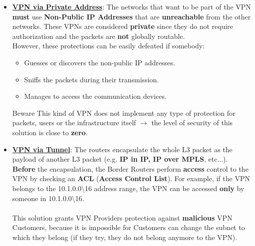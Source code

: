 \begin{itemize}
    \item \underline{\textbf{VPN via Private Address}}: The networks that want to be part of the VPN \textbf{must} use \textbf{Non-Public IP Addresses} that are \textbf{unreachable} from the other networks. These VPNs are considered \textbf{private} since they do not require authorization and the packets are \textbf{not} globally routable.\\   
    However, these protections can be easily defeated if somebody:
    \begin{itemize}
        \item Guesses or discovers the non-public IP addresses.
        \item Sniffs the packets during their transmission.
        \item Manages to access the communication devices.
    \end{itemize}
    \vspace{-0.2cm}
    \begin{quotebox-red}{Beware}
        This kind of VPN does not
        implement any type of protection for packets, users or the infrastructure itself \(\rightarrow \) the level of security of this solution is close to \textbf{zero}.
    \end{quotebox-red}
    \item \underline{\textbf{VPN via Tunnel}}: The routers encapsulate the whole L3 packet as the payload of another L3 packet (e.g. \textbf{IP in
    IP, IP over MPLS}, etc...). \textbf{Before} the encapsulation, the Border Routers perform \textbf{access} control to the VPN by checking an \textbf{ACL} (\textbf{Access Control List}).  
    For example, if the VPN belongs to the 10.1.0.0\textbackslash16 address range, the VPN can be accessed \textbf{only} by someone in 10.1.0.0\textbackslash16.\\    
    \\
    This solution grants VPN Providers protection against \textbf{malicious} VPN Customers, because it is impossible for Customers can change the subnet to which they belong (if they try, they do not belong anymore to the VPN).


\end{itemize}
